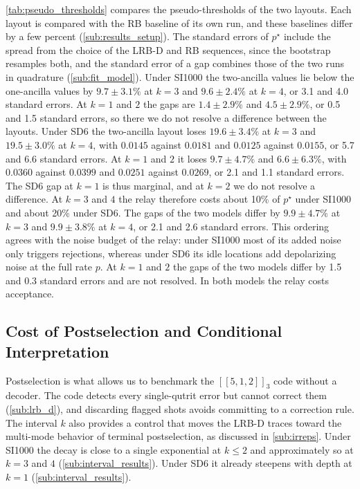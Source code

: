 \autoref{tab:pseudo_thresholds} compares the pseudo-thresholds of the two layouts. Each layout is compared with the RB baseline of its own run, and these baselines differ by a few percent (\autoref{sub:results_setup}). The standard errors of $p^\star$ include the spread from the choice of the LRB-D and RB sequences, since the bootstrap resamples both, and the standard error of a gap combines those of the two runs in quadrature (\autoref{sub:fit_model}).
Under SI1000 the two-ancilla values lie below the one-ancilla values by $9.7 \pm 3.1\%$ at $k = 3$ and $9.6 \pm 2.4\%$ at $k = 4$, or 3.1 and 4.0 standard errors. At $k = 1$ and $2$ the gaps are $1.4 \pm 2.9\%$ and $4.5 \pm 2.9\%$, or 0.5 and 1.5 standard errors, so there we do not resolve a difference between the layouts.
Under SD6 the two-ancilla layout loses $19.6 \pm 3.4\%$ at $k = 3$ and $19.5 \pm 3.0\%$ at $k = 4$, with $0.0145$ against $0.0181$ and $0.0125$ against $0.0155$, or 5.7 and 6.6 standard errors. At $k = 1$ and $2$ it loses $9.7 \pm 4.7\%$ and $6.6 \pm 6.3\%$, with $0.0360$ against $0.0399$ and $0.0251$ against $0.0269$, or 2.1 and 1.1 standard errors. The SD6 gap at $k = 1$ is thus marginal, and at $k = 2$ we do not resolve a difference.
At $k = 3$ and $4$ the relay therefore costs about 10\% of $p^\star$ under SI1000 and about 20\% under SD6. The gaps of the two models differ by $9.9 \pm 4.7\%$ at $k = 3$ and $9.9 \pm 3.8\%$ at $k = 4$, or 2.1 and 2.6 standard errors. This ordering agrees with the noise budget of the relay: under SI1000 most of its added noise only triggers rejections, whereas under SD6 its idle locations add depolarizing noise at the full rate $p$. At $k = 1$ and $2$ the gaps of the two models differ by 1.5 and 0.3 standard errors and are not resolved. In both models the relay costs acceptance.

\subsection{Cost of Postselection and Conditional Interpretation}
\label{sub:postselection_cost}

Postselection is what allows us to benchmark the $[[5,1,2]]_3$ code without a decoder. The code detects every single-qutrit error but cannot correct them (\autoref{sub:lrb_d}), and discarding flagged shots avoids committing to a correction rule. The interval $k$ also provides a control that moves the LRB-D traces toward the multi-mode behavior of terminal postselection, as discussed in \autoref{sub:irreps}. Under SI1000 the decay is close to a single exponential at $k \le 2$ and approximately so at $k = 3$ and $4$ (\autoref{sub:interval_results}). Under SD6 it already steepens with depth at $k = 1$ (\autoref{sub:interval_results}).

